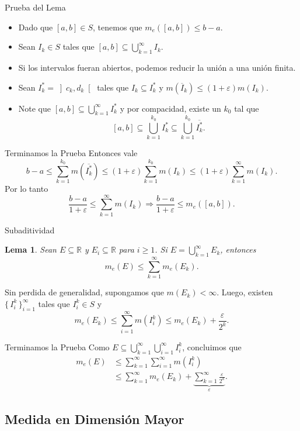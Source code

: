 \documentclass[utf8]{beamer}
\theoremstyle{plain}
\newtheorem{Lem}{Lema}                 %
\theoremstyle{definition}
\theoremstyle{remark}
\numberwithin{equation}{section}
\newcommand{\eps}{\varepsilon}          %
\newcommand{\bR}{\mathbb{R}}    %
\newcommand{\obonj}[1]{\left\rbrack#1\right\lbrack}
\newcommand{\set}[1]{\{\,#1\,\}}    %
\renewcommand{\geq}{\geqslant}          %
\renewcommand{\leq}{\leqslant}          %
\newcommand{\To}{\Rightarrow}
\newcommand{\ov}{\overline}
\newcommand{\suci}{_{i=1}^\infty} %
\newcommand{\suck}{_{k=1}^\infty} %
\renewcommand{\.}{\Cdot}                %
\begin{document}
\begin{frame}{Prueba del Lema}
  \begin{itemize}
    \item Dado que $[a,b]\in S$, tenemos que $m_e([a,b])\leq b-a$. 
    \item Sean $I_k\in S$ tales que $[a,b]\subseteq\bigcup\suck I_k$.
    \item Si los intervalos fueran abiertos, podemos reducir la unión a una unión finita.
    \item Sean $I_k^\ast=\obonj{c_k,d_k}$ tales que $I_k\subseteq I_k^\ast$ y $m(\ov I_k)\leq(1+\eps)m(I_k)$. 
    \item Note que $[a,b]\subseteq\bigcup\suck I_k^\ast$ y por compacidad, existe un $k_0$ tal que 
    $$[a,b]\subseteq \bigcup_{k=1}^{k_0}I_k^\ast\subseteq\bigcup_{k=1}^{k_0}\ov {I_k^\ast}.$$
  \end{itemize}
\end{frame}

\begin{frame}{Terminamos la Prueba}
  Entonces vale
  $$b-a\leq\sum_{k=1}^{k_0}m(\ov {I_k^\ast})\leq(1+\eps)\sum_{k=1}^{k_0}m(I_k)\leq (1+\eps)\sum\suck m(I_k).$$
  Por lo tanto 
  $$\frac{b-a}{1+\eps}\leq \sum\suck m(I_k)\To\frac{b-a}{1+\eps}\leq m_e([a,b]).$$
\end{frame}

\begin{frame}{Subaditividad}
  \begin{Lem}\label{lem:subadivitidad}
Sean $E\subseteq \bR$ y $E_i\subseteq\bR$ para $i\geq 1$. Si $E=\bigcup\suck E_k$, entonces
$$m_e(E)\leq\sum\suck m_e(E_k).$$
  \end{Lem}
  Sin perdida de generalidad, supongamos que $m(E_k)<\infty$. Luego, existen $\set{I_i^k}\suci$ tales que $I_i^k\in S$ y 
  $$m_e(E_k)\leq \sum\suci m(I_i^k)\leq m_e(E_k)+\frac{\eps}{2^k}.$$
\end{frame}

\begin{frame}{Terminamos la Prueba}
  Como $E\subseteq \bigcup\suck\bigcup\suci I_i^k$, concluimos que 
\begin{align*}
  m_e(E)&\leq \sum\suck\sum\suci m(I_i^k)\\
  &\leq \sum\suck m_e(E_k)+\underbrace{\sum\suck \frac{\eps}{2^k}}_{\eps}.
\end{align*}
\end{frame}

\subsection{Medida en Dimensión Mayor}
\end{document}
